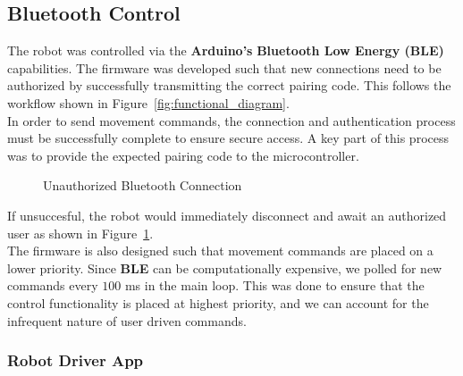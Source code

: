 \documentclass{article}
\begin{document}
\subsection{Bluetooth Control}

\begin{minipage}{\linewidth}
    The robot was controlled via the \textbf{Arduino's} \textbf{Bluetooth Low Energy (BLE)} capabilities.
    The firmware was developed such that new connections need to be authorized by successfully transmitting
    the correct pairing code. This follows the workflow shown in Figure~\ref{fig:functional_diagram}. \\

    In order to send movement commands, the connection and authentication process must be successfully complete to ensure secure access. A key
    part of this process was to provide the expected pairing code to the microcontroller. \\
\end{minipage}

\begin{figure}[H]
    \centering
    \caption{Unauthorized Bluetooth Connection}
    \label{fig:bluetooth_unauthorized}
\end{figure}

\begin{minipage}{\linewidth}
    If unsuccesful, the robot would immediately disconnect and await an authorized user as shown in Figure~\ref{fig:bluetooth_unauthorized}. \\

    The firmware is also designed such that movement commands are placed on a lower priority. Since \textbf{BLE} can be computationally expensive,
    we polled for new commands every $100$ ms in the main loop. This was done to ensure that the control functionality is placed at highest priority,
    and we can account for the infrequent nature of user driven commands.
\end{minipage}

\subsubsection{Robot Driver App}
\end{document}
